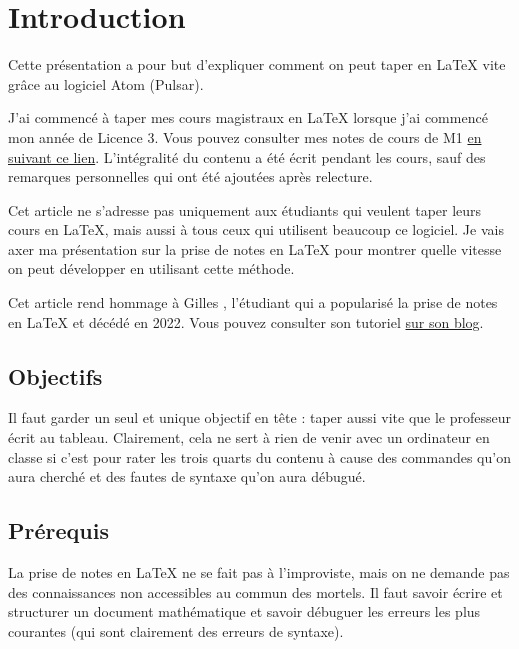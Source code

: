 \documentclass[french]{article}
\title{\bsc{Tutoriel Atom + \LaTeX}}
\date{2023}
\theoremstyle{definition}
\theoremstyle{remark}
\begin{document}
\maketitle

\tableofcontents

\section{Introduction}

Cette présentation a pour but d'expliquer comment on peut taper en LaTeX vite grâce au logiciel Atom (Pulsar).

J'ai commencé à taper mes cours magistraux en LaTeX lorsque j'ai commencé mon année de Licence 3. Vous pouvez consulter mes notes de cours de M1 \href{https://github.com/volkhovcossack/M1-AAPM}{en suivant ce lien}. L'intégralité du contenu a été écrit pendant les cours, sauf  des remarques personnelles qui ont été ajoutées après relecture.

Cet article ne s'adresse pas uniquement aux étudiants qui veulent taper leurs cours en LaTeX, mais aussi à tous ceux qui utilisent beaucoup ce logiciel. Je vais axer ma présentation sur la prise de notes en LaTeX pour montrer quelle vitesse on peut développer en utilisant cette méthode.

Cet article rend hommage à Gilles , l'étudiant qui a popularisé la prise de notes en LaTeX et décédé en 2022. Vous pouvez consulter son tutoriel \href{https://castel.dev/post/lecture-notes-1/}{sur son blog}.

\subsection{Objectifs}

Il faut garder un seul et unique objectif en tête : taper aussi vite que le professeur écrit au tableau. Clairement, cela ne sert à rien de venir avec un ordinateur en classe si c'est pour rater les trois quarts du contenu à cause des commandes qu'on aura cherché et des fautes de syntaxe qu'on aura débugué.

\subsection{Prérequis}

La prise de notes en LaTeX ne se fait pas à l'improviste, mais on ne demande pas des connaissances non accessibles au commun des mortels. Il faut savoir écrire et structurer un document mathématique et savoir débuguer les erreurs les plus courantes (qui sont clairement des erreurs de syntaxe).
\end{document}
